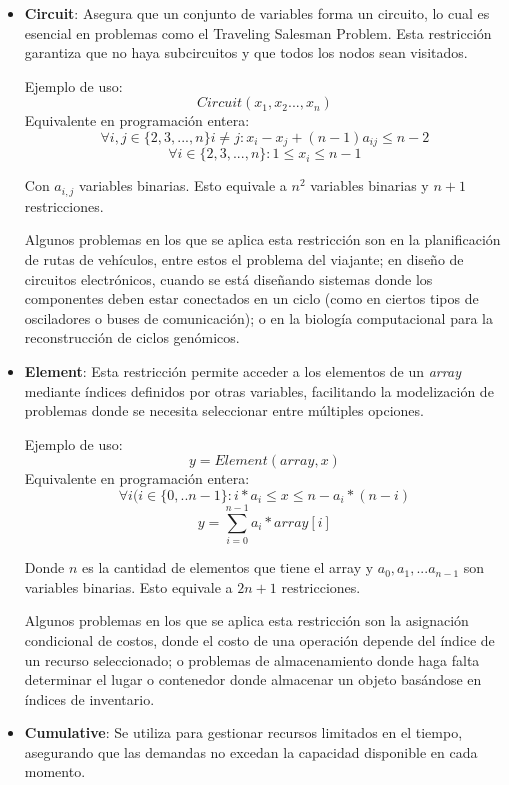 \documentclass[12pt]{report}
\begin{document}
\begin{itemize}
    \item \textbf{Circuit}: Asegura que un conjunto de variables forma un circuito, lo cual es esencial en problemas como el Traveling Salesman Problem. Esta restricción garantiza que no haya subcircuitos y que todos los nodos sean visitados.
    
    Ejemplo de uso:
    $$Circuit(x_1,x_2...,x_n)$$
    Equivalente en programación entera:
    $$\forall i,j\in\{2,3,...,n\}i\neq j:x_i-x_j+(n-1)a_{ij}\leq n-2$$
    $$\forall i\in\{2,3,...,n\}: 1\leq x_i\leq n-1$$

    Con $a_{i,j}$ variables binarias. Esto equivale a $n^2$ variables binarias y $n+1$ restricciones.

    Algunos problemas en los que se aplica esta restricción son en la planificación de rutas de vehículos, entre estos el problema del viajante; en diseño de circuitos electrónicos, cuando se está diseñando sistemas donde los componentes deben estar conectados en un ciclo (como en ciertos tipos de osciladores o buses de comunicación); o en la biología computacional para la reconstrucción de ciclos genómicos.\\
    
    \item \textbf{Element}: Esta restricción permite acceder a los elementos de un \textit{array} mediante índices definidos por otras variables, facilitando la modelización de problemas donde se necesita seleccionar entre múltiples opciones.

    
    Ejemplo de uso:
    $$y=Element(array,x)$$
    Equivalente en programación entera:
        $$\forall i(i\in\{0,..n-1\}:i*a_i\leq x\leq n - a_i*(n-i)$$
        $$y=\sum_{i=0}^{n-1}a_i*array[i]$$

    Donde $n$ es la cantidad de elementos que tiene el array y $a_0,a_1,...a_{n-1}$ son variables binarias. Esto equivale a $2n+1$ restricciones.

    Algunos problemas en los que se aplica esta restricción son la asignación condicional de costos, donde el costo de una operación depende del índice de un recurso seleccionado; o problemas de almacenamiento donde haga falta determinar el lugar o contenedor donde almacenar un objeto basándose en índices de inventario.\\
    
    \item \textbf{Cumulative}: Se utiliza para gestionar recursos limitados en el tiempo, asegurando que las demandas no excedan la capacidad disponible en cada momento.
    

\end{itemize}
\end{document}
